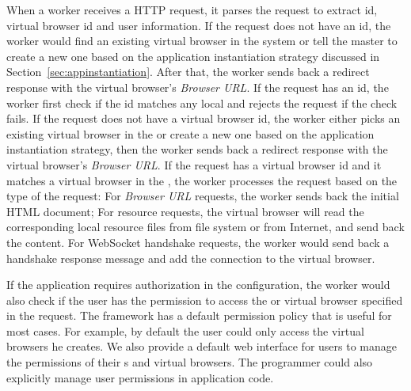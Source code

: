 
When a worker receives a HTTP request, it parses the request to extract
\appins id, virtual browser id and user information. If the request does not
have an \appins id, the worker would find an existing virtual browser in the
system or tell the master to create a new one  based on the application
instantiation strategy discussed in Section~\ref{sec:appinstantiation}. After
that, the worker sends back a redirect response with the virtual browser's
\emph{Browser URL}. If the request has an \appins id, the worker first check
if the id matches any local \appins and rejects the request if the check
fails. If the request does not have a virtual browser id, the worker either
picks an existing virtual browser in the \appins  or create a new one based on
the application instantiation strategy, then the worker sends back a redirect
response with  the virtual browser's \emph{Browser URL}. If the request has a
virtual browser id and it matches a virtual browser in the \appins, the worker
processes the request based on the type of the request: For \emph{Browser URL}
requests, the worker sends back the initial  HTML document; For resource
requests, the virtual browser will read the corresponding local resource files
from file system or from Internet, and send back the content. For WebSocket
handshake requests, the worker would send back a handshake response message
and add the connection to the virtual browser.


If the application requires authorization in the configuration, the
worker would also check if the user has the permission to access the \appins
or virtual browser specified in the request. The framework has a default
permission policy that is useful for most cases. For example, by default the
user could only access the virtual browsers he creates. We also provide a
default web interface for users to manage the permissions of their \appins{}s
and virtual browsers. The programmer could also explicitly manage user
permissions in application code.


